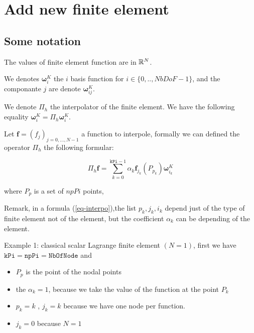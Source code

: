 \section{Add new finite element}

\subsection{Some notation}
\def\Fb#1{\boldsymbol{\omega}^{K}_{#1}}
\def\fbi{\mathbf{\omega}^{K}_{ij}}

The values of finite element function  are in $\mathbb{R}^{N}$.






 

We denotes $\Fb{i}$ the $i$ basis function
  for  $i\in \{0,..,NbDoF-1\}$, and
  the componante $j$  are denote $\fbi$.
  
We denote $\Pi_{h}$ the interpolator of the finite element.
We have the following equality $\Fb{i} =  \Pi_{h} \Fb{i} $.

Let $\boldsymbol{f}=(f_j)_{j=0,...,N-1} $ a function to interpole,
formally we can defined the operator $\Pi_{h}$ 
the following formular:
  
\begin{equation}
\Pi_{h} \boldsymbol{f} = \sum_{k=0}^{\mathtt{kPi}-1} \alpha_k \boldsymbol{f}_{j_{k}}({P_{p_{k}}}) \Fb{i_{k}} \label{eq-interpo}
\end{equation}
  
where $P_{p}$ is a set of $npPi$ points, 

Remark, in a formula (\ref{eq-interpo}),the list $ p_{k},j_{k},i_{k}$ depend just of  the type of finite element not of the element, but the coefficient  $\alpha_{k}$ can be depending of the 
element. 

\medskip
 Example 1: classical scalar  Lagrange finite element $(N=1)$, first we have $\mathtt{kPi}=\mathtt{npPi}=\mathtt{NbOfNode}$ and
\begin{itemize}
\item $P_{p}$ is the point of the nodal points
\item  the $\alpha_k=1$, because we take the value  of the function at the point $P_{k}$
\item $p_{k}=k$ ,  $j_{k}=k$ because we have one node per  function.
\item $j_{k}=0$ because $N=1$
\end{itemize}
  

